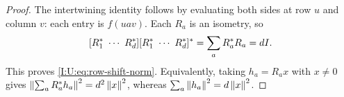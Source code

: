 \begin{proof}
The intertwining identity follows by evaluating both sides at row $u$
and column $v$: each entry is $f(uav)$.  Each $R_a$ is an isometry, so
\[
 [R_1^*\ \cdots\ R_d^*]
 [R_1^*\ \cdots\ R_d^*]^*
 =\sum_aR_a^*R_a=dI.
\]
This proves \eqref{I:U:eq:row-shift-norm}.  Equivalently, taking
$h_a=R_ax$ with $x\ne0$ gives
$\left\lVert\sum_aR_a^*h_a\right\rVert^2=d^2\left\lVert x\right\rVert^2$, whereas
$\sum_a\left\lVert h_a\right\rVert^2=d\left\lVert x\right\rVert^2$.
\end{proof}
